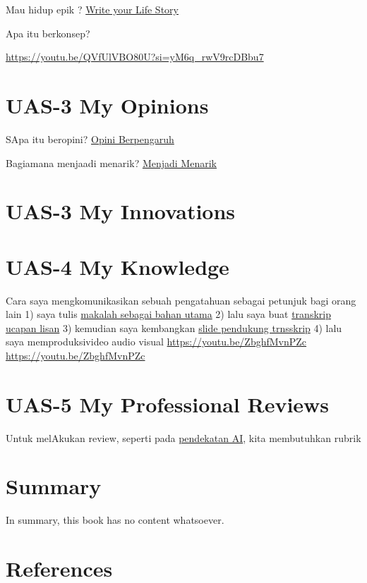 \documentclass[
  letterpaper,
  DIV=11,
  numbers=noendperiod]{scrreprt}
\begin{document}
Mau hidup epik ? \href{lifestory.pdf}{Write your Life Story}

Apa itu berkonsep?

\url{https://youtu.be/QVfUlVBO80U?si=yM6q_rwV9rcDBbu7}


\chapter{UAS-3 My Opinions}\label{uas-3-my-opinions}

SApa itu beropini? \href{BM\%20Opini.mp4}{Opini Berpengaruh}

Bagiamana menjaadi menarik? \href{./Interesting.mp4}{Menjadi Menarik}


\chapter{UAS-3 My Innovations}\label{uas-3-my-innovations}


\chapter{UAS-4 My Knowledge}\label{uas-4-my-knowledge}

Cara saya mengkomunikasikan sebuah pengatahuan sebagai petunjuk bagi
orang lain 1) saya tulis
\href{Rekomendasi\%20Presentasi\%20Efektif(Contoh\%20Makalah).pdf}{makalah
sebagai bahan utama} 2) lalu saya buat
\href{Contoh\%20Transkrip\%20Presentasi.pdf}{transkrip ucapan lisan} 3)
kemudian saya kembangkan
\href{Rekomendasi\%20Presentasi\%20(Contoh\%20Slides).pdf}{slide
pendukung trnsskrip} 4) lalu saya memproduksivideo audio visual
\url{https://youtu.be/ZbghfMvnPZc} \url{https://youtu.be/ZbghfMvnPZc}


\chapter{UAS-5 My Professional
Reviews}\label{uas-5-my-professional-reviews}

Untuk melAkukan review, seperti pada
\href{../My_Personal_Reviews/Doc.5.Mengevaluasi-Esai-Berdasarkan-Rubrik.pdf}{pendekatan
AI}, kita membutuhkan rubrik


\chapter{Summary}\label{summary}

In summary, this book has no content whatsoever.


\chapter*{References}\label{references}


\label{refs}
\end{document}
